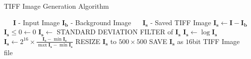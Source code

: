 \begin{algorithm}
	\caption{TIFF Image Generation Algorithm} \label{alg:tiffimalg}
	\scriptsize
	\begin{algorithmic}[1]
		\Require~~
		\Statex $\mathbf{I}$ - Input Image
		\Statex $\mathbf{I_b}$ - Background Image
		\Ensure~~
		\Statex $\mathbf{I_s}$ - Saved TIFF Image
		\Statex
		\State $\mathbf{I_s} \gets \mathbf{I} - \mathbf{I_b}$ 
		\State $\mathbf{I_s} \leq 0 \gets 0$
		\State $\mathbf{I_s}  \gets $ STANDARD DEVIATION FILTER of $\mathbf{I_s}$
		\State $\mathbf{I_s} \gets \log{\mathbf{I_s}}$
		\State $\mathbf{I_s} \gets 2^{16} \times \frac{\mathbf{I_s} - \min{\mathbf{I_s}}}{\max{\mathbf{I_s}} - \min{\mathbf{I_s}}}$
		\State RESIZE $\mathbf{I_s}$ to $500 \times 500$
		\State SAVE $\mathbf{I_s}$ as $16$bit TIFF Image file
	\end{algorithmic}
\end{algorithm}
